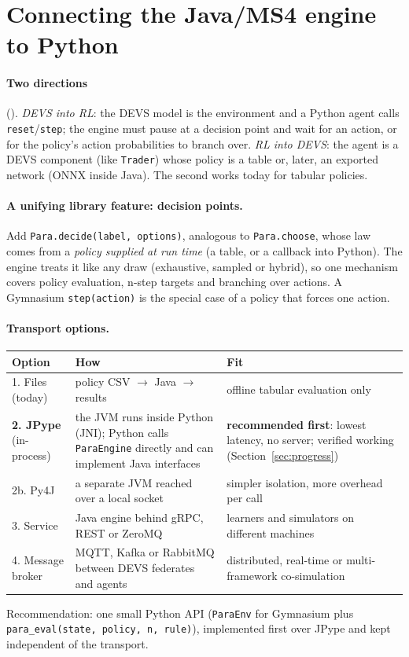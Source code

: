 \documentclass[11pt]{article}
\newcommand{\code}[1]{\texttt{#1}}
\begin{document}
\section{Connecting the Java/MS4 engine to Python}

\paragraph{Two directions} ().
\emph{DEVS into RL}: the DEVS model is the environment and a Python agent calls \code{reset}/\code{step}; the engine
must pause at a decision point and wait for an action, or for the policy's action probabilities to branch over.
\emph{RL into DEVS}: the agent is a DEVS component (like \code{Trader}) whose policy is a table or, later, an exported
network (ONNX inside Java). The second works today for tabular policies.

\paragraph{A unifying library feature: decision points.} Add \code{Para.decide(label, options)}, analogous to
\code{Para.choose}, whose law comes from a \emph{policy supplied at run time} (a table, or a callback into Python). The
engine treats it like any draw (exhaustive, sampled or hybrid), so one mechanism covers policy evaluation, n-step
targets and branching over actions. A Gymnasium \code{step(action)} is the special case of a policy that forces one
action.

\paragraph{Transport options.}
\begin{center}
\small
\begin{tabularx}{\linewidth}{@{}p{3.6cm} Y Y@{}}
\toprule
\textbf{Option} & \textbf{How} & \textbf{Fit}\\
. Files (today) & policy CSV $\to$ Java $\to$ results & offline tabular evaluation only\\
\textbf{2. JPype} (in-process) & the JVM runs inside Python (JNI); Python calls \code{ParaEngine} directly and can implement Java interfaces & \textbf{recommended first}: lowest latency, no server; verified working (Section~\ref{sec:progress})\\
2b. Py4J & a separate JVM reached over a local socket & simpler isolation, more overhead per call\\
3. Service & Java engine behind gRPC, REST or ZeroMQ & learners and simulators on different machines\\
4. Message broker & MQTT, Kafka or RabbitMQ between DEVS federates and agents & distributed, real-time or multi-framework co-simulation\\
\bottomrule
\end{tabularx}
\end{center}
Recommendation: one small Python API (\code{ParaEnv} for Gymnasium plus \code{para\_eval(state, policy, n, rule)}),
implemented first over JPype and kept independent of the transport.
\end{document}
